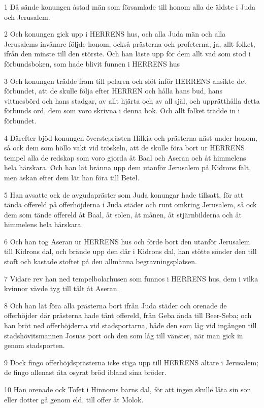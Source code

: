 \par 1 Då sände konungen åstad män som församlade till honom alla de äldste i Juda och Jerusalem.
\par 2 Och konungen gick upp i HERRENS hus, och alla Juda män och alla Jerusalems invånare följde honom, också prästerna och profeterna, ja, allt folket, ifrån den minste till den störste. Och han läste upp för dem allt vad som stod i förbundsboken, som hade blivit funnen i HERRENS hus
\par 3 Och konungen trädde fram till pelaren och slöt inför HERRENS ansikte det förbundet, att de skulle följa efter HERREN och hålla hans bud, hans vittnesbörd och hans stadgar, av allt hjärta och av all själ, och upprätthålla detta förbunds ord, dem som voro skrivna i denna bok. Och allt folket trädde in i förbundet.
\par 4 Därefter bjöd konungen översteprästen Hilkia och prästerna näst under honom, så ock dem som höllo vakt vid tröskeln, att de skulle föra bort ur HERRENS tempel alla de redskap som voro gjorda åt Baal och Aseran och åt himmelens hela härskara. Och han lät bränna upp dem utanför Jerusalem på Kidrons fält, men askan efter dem lät han föra till Betel.
\par 5 Han avsatte ock de avgudapräster som Juda konungar hade tillsatt, för att tända offereld på offerhöjderna i Juda städer och runt omkring Jerusalem, så ock dem som tände offereld åt Baal, åt solen, åt månen, åt stjärnbilderna och åt himmelens hela härskara.
\par 6 Och han tog Aseran ur HERRENS hus och förde bort den utanför Jerusalem till Kidrons dal, och brände upp den där i Kidrons dal, han stötte sönder den till stoft och kastade stoftet på den allmänna begravningsplatsen.
\par 7 Vidare rev han ned tempelbolarhusen som funnos i HERRENS hus, dem i vilka kvinnor vävde tyg till tält åt Aseran.
\par 8 Och han lät föra alla prästerna bort ifrån Juda städer och orenade de offerhöjder där prästerna hade tänt offereld, från Geba ända till Beer-Seba; och han bröt ned offerhöjderna vid stadsportarna, både den som låg vid ingången till stadshövitsmannen Josuas port och den som låg till vänster, när man gick in genom stadsporten.
\par 9 Dock fingo offerhöjdsprästerna icke stiga upp till HERRENS altare i Jerusalem; de fingo allenast äta osyrat bröd ibland sina bröder.
\par 10 Han orenade ock Tofet i Hinnoms barns dal, för att ingen skulle låta sin son eller dotter gå genom eld, till offer åt Molok.

